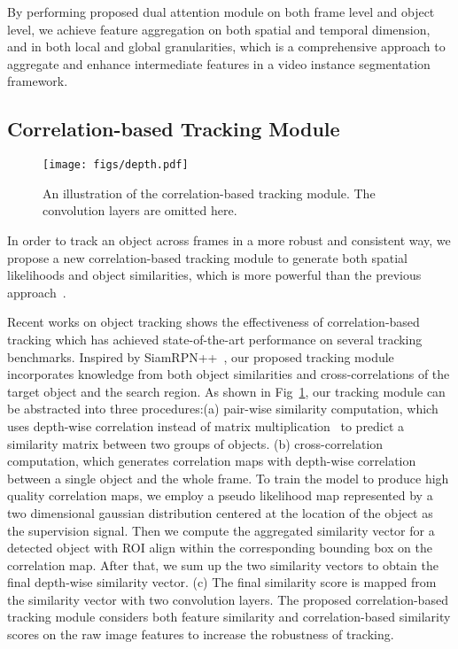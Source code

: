 \documentclass[letterpaper]{article} \usepackage{aaai21}  \usepackage{times}  \usepackage{helvet} \usepackage{courier}  \usepackage[hyphens]{url}  \usepackage{graphicx} \urlstyle{rm} \def\UrlFont{\rm}  \usepackage{natbib}  \usepackage{caption} \frenchspacing  \setlength{\pdfpagewidth}{8.5in}  \setlength{\pdfpageheight}{11in}  \newcommand{\etal}{\emph{et al. }}
\begin{document}
By performing proposed dual attention module on both frame level and object level, we achieve feature aggregation on both spatial and temporal dimension, and in both local and global granularities, which is a comprehensive approach to aggregate and enhance intermediate features in a video instance segmentation framework.

\subsection{Correlation-based Tracking Module}

\begin{figure}[t]
	\centering
	\texttt{[image: figs/depth.pdf]}
\caption{An illustration of the correlation-based tracking module. The convolution layers are omitted here.}
	\label{fig:track}
\end{figure}

In order to track an object across frames in a more robust and consistent way, we propose a new correlation-based tracking module to generate both spatial likelihoods and object similarities, which is more powerful than the previous approach~\cite{yang2019video}.

Recent works on object tracking shows the effectiveness of correlation-based tracking which has achieved state-of-the-art performance on several tracking benchmarks. Inspired by SiamRPN++~\cite{li2019siamrpn++}, our proposed tracking module incorporates knowledge from both object similarities and cross-correlations of the target object and the search region. As shown in Fig~\ref{fig:track}, our tracking module can be abstracted into three procedures:(a) pair-wise similarity computation, which uses depth-wise correlation instead of matrix multiplication~\cite{yang2019video} to predict a similarity matrix between two groups of objects. (b) cross-correlation computation, which generates correlation maps with depth-wise correlation between a single object and the whole frame. To train the model to produce high quality correlation maps, we employ a pseudo likelihood map represented by a two dimensional gaussian distribution centered at the location of the object as the supervision signal. Then we compute the aggregated similarity vector for a detected object with ROI align within the corresponding bounding box on the correlation map. 
After that, we sum up the two similarity vectors to obtain the final depth-wise similarity vector. (c) The final similarity score is mapped from the similarity vector with  two  convolution layers. The proposed correlation-based tracking module considers both feature similarity and correlation-based similarity scores on the raw image features to increase the robustness of tracking.
\end{document}
